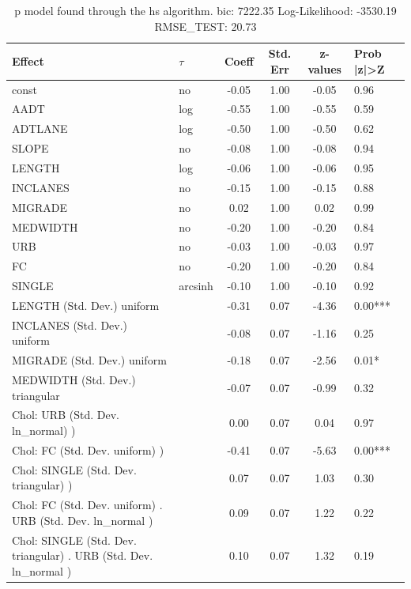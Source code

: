 \begin{table}
	\caption{p model found through the hs algorithm. bic: 7222.35 Log-Likelihood: -3530.19 RMSE_TEST: 20.73}
	\begin{center}
		\begin{tabular}{|l|l|c|c|c|l|}
			\hline
			Effect & $\tau$ & Coeff & Std. Err & z-values & Prob |z|>Z \\
			\hline
			const & no & -0.05 & 1.00 & -0.05 & 0.96 \\
			\hline
			AADT & log & -0.55 & 1.00 & -0.55 & 0.59 \\
			\hline
			ADTLANE & log & -0.50 & 1.00 & -0.50 & 0.62 \\
			\hline
			SLOPE & no & -0.08 & 1.00 & -0.08 & 0.94 \\
			\hline
			LENGTH & log & -0.06 & 1.00 & -0.06 & 0.95 \\
			\hline
			INCLANES & no & -0.15 & 1.00 & -0.15 & 0.88 \\
			\hline
			MIGRADE & no & 0.02 & 1.00 & 0.02 & 0.99 \\
			\hline
			MEDWIDTH & no & -0.20 & 1.00 & -0.20 & 0.84 \\
			\hline
			URB & no & -0.03 & 1.00 & -0.03 & 0.97 \\
			\hline
			FC & no & -0.20 & 1.00 & -0.20 & 0.84 \\
			\hline
			SINGLE & arcsinh & -0.10 & 1.00 & -0.10 & 0.92 \\
			\hline
			LENGTH (Std. Dev.) uniform &  & -0.31 & 0.07 & -4.36 & 0.00*** \\
			\hline
			INCLANES (Std. Dev.) uniform &  & -0.08 & 0.07 & -1.16 & 0.25 \\
			\hline
			MIGRADE (Std. Dev.) uniform &  & -0.18 & 0.07 & -2.56 & 0.01* \\
			\hline
			MEDWIDTH (Std. Dev.) triangular &  & -0.07 & 0.07 & -0.99 & 0.32 \\
			\hline
			 Chol: URB (Std. Dev. ln_normal) ) &  & 0.00 & 0.07 & 0.04 & 0.97 \\
			\hline
			 Chol: FC (Std. Dev. uniform) ) &  & -0.41 & 0.07 & -5.63 & 0.00*** \\
			\hline
			 Chol: SINGLE (Std. Dev. triangular) ) &  & 0.07 & 0.07 & 1.03 & 0.30 \\
			\hline
			 Chol: FC (Std. Dev. uniform) . URB (Std. Dev.   ln_normal ) &  & 0.09 & 0.07 & 1.22 & 0.22 \\
			\hline
			 Chol: SINGLE (Std. Dev. triangular) . URB (Std. Dev.   ln_normal ) &  & 0.10 & 0.07 & 1.32 & 0.19 \\

\end{tabular}
\end{center}
\end{table}
